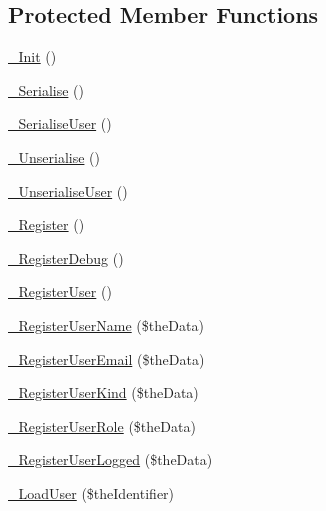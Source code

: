 \subsection*{Protected Member Functions}
\begin{DoxyCompactItemize}
\item 
\hyperlink{class_c_session_object_a4b19d8709c77a4859e89085046372d96}{\-\_\-\-Init} ()
\item 
\hyperlink{class_c_session_object_afd958aa9af32a6643fac276712edb8ce}{\-\_\-\-Serialise} ()
\item 
\hyperlink{class_c_session_object_a2cc6c649af17861db87fc886711e6d59}{\-\_\-\-Serialise\-User} ()
\item 
\hyperlink{class_c_session_object_a252aab94fb0d51a8cadef06178f90e6f}{\-\_\-\-Unserialise} ()
\item 
\hyperlink{class_c_session_object_a3efbc1dc960349ed5499ee43543f0380}{\-\_\-\-Unserialise\-User} ()
\item 
\hyperlink{class_c_session_object_a8475f37a5fe74bc8816f3052cdd5e385}{\-\_\-\-Register} ()
\item 
\hyperlink{class_c_session_object_a9b5fd0ca626b4ba08bacbda059e54c74}{\-\_\-\-Register\-Debug} ()
\item 
\hyperlink{class_c_session_object_aee66e1fcbc50a1725238fa7163832ba5}{\-\_\-\-Register\-User} ()
\item 
\hyperlink{class_c_session_object_a0345117655cf1ba40be1e1b500f5a7dd}{\-\_\-\-Register\-User\-Name} (\$the\-Data)
\item 
\hyperlink{class_c_session_object_a5c44a2853eb3bf17f2b245a1d08d1789}{\-\_\-\-Register\-User\-Email} (\$the\-Data)
\item 
\hyperlink{class_c_session_object_a176a0b3924e37a92f3d3e98d2cbe9e95}{\-\_\-\-Register\-User\-Kind} (\$the\-Data)
\item 
\hyperlink{class_c_session_object_a041b2a36d0b05d372a672d9235e475f6}{\-\_\-\-Register\-User\-Role} (\$the\-Data)
\item 
\hyperlink{class_c_session_object_a12ed08d679674a218469784b199a85af}{\-\_\-\-Register\-User\-Logged} (\$the\-Data)
\item 
\hyperlink{class_c_session_object_a2fd936580b9d8f0cecc22755726b8811}{\-\_\-\-Load\-User} (\$the\-Identifier)
\end{DoxyCompactItemize}

